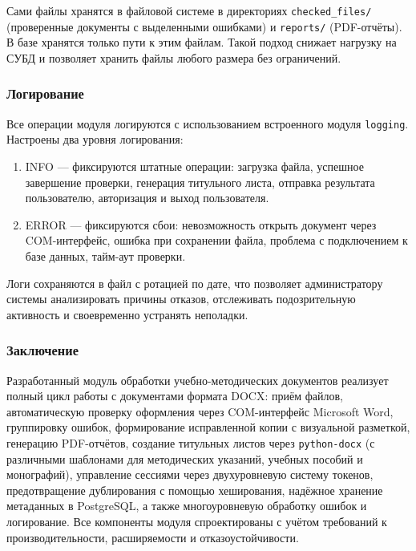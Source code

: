 Сами файлы хранятся в файловой системе в директориях \texttt{checked\_files/} (проверенные документы с выделенными ошибками) и \texttt{reports/} (PDF-отчёты). В базе хранятся только пути к этим файлам. Такой подход снижает нагрузку на СУБД и позволяет хранить файлы любого размера без ограничений.

\subsubsection{Логирование}

Все операции модуля логируются с использованием встроенного модуля \texttt{logging}. Настроены два уровня логирования:

\begin{enumerate}
	\item INFO — фиксируются штатные операции: загрузка файла, успешное завершение проверки, генерация титульного листа, отправка результата пользователю, авторизация и выход пользователя.
	
	\item ERROR — фиксируются сбои: невозможность открыть документ через COM-интерфейс, ошибка при сохранении файла, проблема с подключением к базе данных, тайм-аут проверки.
\end{enumerate}

Логи сохраняются в файл с ротацией по дате, что позволяет администратору системы анализировать причины отказов, отслеживать подозрительную активность и своевременно устранять неполадки.

\subsubsection{Заключение}

Разработанный модуль обработки учебно-методических документов реализует полный цикл работы с документами формата DOCX: приём файлов, автоматическую проверку оформления через COM-интерфейс Microsoft Word, группировку ошибок, формирование исправленной копии с визуальной разметкой, генерацию PDF-отчётов, создание титульных листов через \texttt{python-docx} (с различными шаблонами для методических указаний, учебных пособий и монографий), управление сессиями через двухуровневую систему токенов, предотвращение дублирования с помощью хеширования, надёжное хранение метаданных в PostgreSQL, а также многоуровневую обработку ошибок и логирование. Все компоненты модуля спроектированы с учётом требований к производительности, расширяемости и отказоустойчивости.

